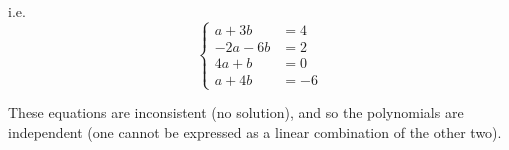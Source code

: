 i.e.
$$
\begin{cases}
    a + 3b &= 4 \\
    -2a - 6b &= 2 \\
    4a + b &= 0 \\
    a + 4b &= -6
\end{cases}
$$

These equations are inconsistent (no solution), and so the polynomials are independent (one cannot be expressed as a linear combination of the other two).



